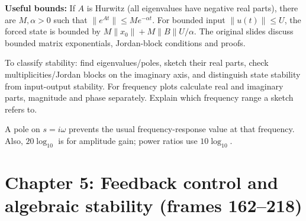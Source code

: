 \documentclass[10pt,a4paper]{article}
\begin{document}
\begin{formbox}\textbf{Useful bounds:} If $A$ is Hurwitz (all eigenvalues have negative real parts), there are $M,\alpha>0$ such that $\|e^{At}\|\le M e^{-\alpha t}$. For bounded input $\|u(t)\|\le U$, the forced state is bounded by $M\|x_0\|+M\|B\|U/\alpha$. The original slides discuss bounded matrix exponentials, Jordan-block conditions and proofs.\end{formbox}
\begin{exambox}To classify stability: find eigenvalues/poles, sketch their real parts, check multiplicities/Jordan blocks on the imaginary axis, and distinguish state stability from input-output stability. For frequency plots calculate real and imaginary parts, magnitude and phase separately. Explain which frequency range a sketch refers to.\end{exambox}
\begin{warnbox}A pole on $s=i\omega$ prevents the usual frequency-response value at that frequency. Also, $20\log_{10}$ is for amplitude gain; power ratios use $10\log_{10}$.\end{warnbox}


\section{Chapter 5: Feedback control and algebraic stability (frames 162--218)}
\end{document}
